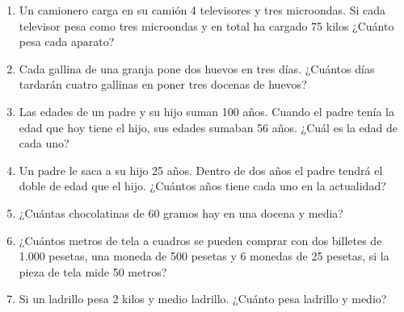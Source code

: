 \documentclass[twoside]{article}
\begin{document}
\begin{enumerate}
\item Un camionero carga en su camión 4 televisores y tres microondas. Si cada televisor pesa como tres microondas y en total ha cargado 75 kilos ¿Cuánto pesa cada aparato?
\item Cada gallina de una granja pone dos huevos en tres días. ¿Cuántos días tardarán cuatro gallinas en poner tres docenas de huevos?
\item Las edades de un padre y su hijo suman 100 años. Cuando el padre tenía la edad que hoy tiene el hijo, sus edades sumaban 56 años. ¿Cuál es la edad de cada uno?
\item Un padre le saca a su hijo 25 años. Dentro de dos años el padre tendrá el doble de edad que el hijo. ¿Cuántos años tiene cada uno en la actualidad? 
\item ¿Cuántas chocolatinas de 60 gramos hay en una docena y media? 
\item ¿Cuántos metros de tela a cuadros se pueden comprar con dos billetes de 1.000 pesetas, una moneda de 500 pesetas y 6 monedas de 25 pesetas, si la pieza de tela mide 50 metros?
\item Si un ladrillo pesa 2 kilos y medio ladrillo. ¿Cuánto pesa ladrillo y medio?
\end{enumerate}
\end{document}
